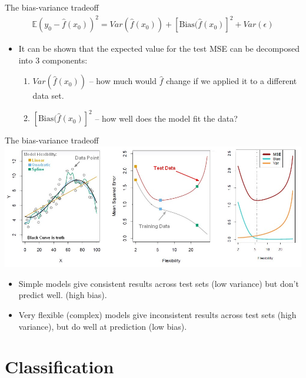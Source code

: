 \documentclass{beamer}
\begin{document}
\begin{frame}{The bias-variance tradeoff}
\begin{align*}
	\mathbb{E} (y_{0} - \hat{f}(x_{0}))^{2} = Var(\hat{f}(x_{0})) + [\text{Bias}(\hat{f}(x_{0})]^{2} + Var(\epsilon)
\end{align*}
	\begin{itemize}
		\item It can be shown that the expected value for the test MSE can be decomposed into 3 components:
			\begin{enumerate}
				\item $Var(\hat{f}(x_{0}))$ -- how much would $\hat{f}$ change if we applied it to a different data set.
				\item $ [\text{Bias}(\hat{f}(x_{0})]^{2}$ -- how well does the model fit the data?
			\end{enumerate}
	\end{itemize}
\end{frame}


\begin{frame}{The bias-variance tradeoff}
\centering
\includegraphics[scale=.3]{bias-variance}
	\begin{itemize}
		\item Simple models give consistent results across test sets (low variance) but don't predict well. (high bias).
		\item Very flexible (complex) models give inconsistent results across test sets (high variance), but do well at prediction (low bias).
	\end{itemize}
\end{frame}

\section*{Classification}
\end{document}
